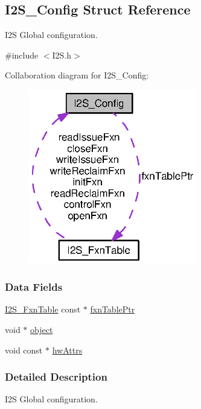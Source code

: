 \subsection{I2\+S\+\_\+\+Config Struct Reference}
\label{struct_i2_s___config}


I2\+S Global configuration.  




{\ttfamily \#include $<$I2\+S.\+h$>$}



Collaboration diagram for I2\+S\+\_\+\+Config\+:
\nopagebreak
\begin{figure}[H]
\begin{center}
\leavevmode
\includegraphics[width=208pt]{struct_i2_s___config__coll__graph}
\end{center}
\end{figure}
\subsubsection*{Data Fields}
\begin{DoxyCompactItemize}
\item 
\hyperlink{struct_i2_s___fxn_table}{I2\+S\+\_\+\+Fxn\+Table} const $\ast$ \hyperlink{struct_i2_s___config_a99407a28338a873ebf0ccbe18b7cfd24}{fxn\+Table\+Ptr}
\item 
void $\ast$ \hyperlink{struct_i2_s___config_aa7e7ee65f8c52e2ca5de1cfb7fea1276}{object}
\item 
void const $\ast$ \hyperlink{struct_i2_s___config_a6ebd7b14353f66a0e0d1c406ff5b481e}{hw\+Attrs}
\end{DoxyCompactItemize}


\subsubsection{Detailed Description}
I2\+S Global configuration. 

